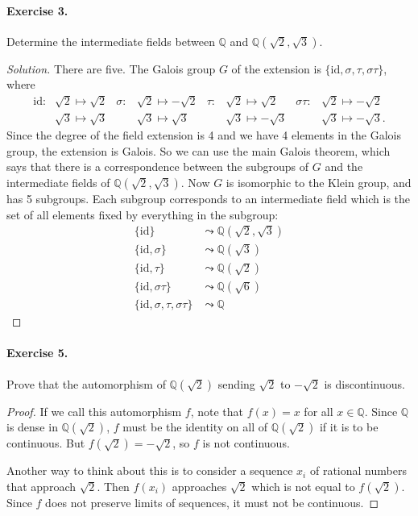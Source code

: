 \documentclass{article}
\begin{document}
\paragraph{Exercise 3.} Determine the intermediate fields between $\mathbb Q$ and $\mathbb Q(\sqrt 2,\sqrt 3)$.
\begin{proof}[Solution]
There are five. The Galois group $G$ of the extension is $\{\text{id},\sigma,\tau,\sigma\tau\}$, where
\begin{align*}
\text{id}:&\sqrt 2\mapsto \sqrt 2 &
\sigma:& \sqrt 2\mapsto -\sqrt 2 &
\tau:& \sqrt 2\mapsto \sqrt 2 &
\sigma\tau:& \sqrt 2\mapsto -\sqrt 2 \\
&\sqrt 3\mapsto \sqrt 3 &
& \sqrt 3\mapsto \sqrt 3 &
& \sqrt 3\mapsto -\sqrt 3 &
& \sqrt 3\mapsto -\sqrt 3 .
\end{align*}
Since the degree of the field extension is 4 and we have 4 elements in the Galois group, the extension is Galois. So we can use the main Galois theorem, which says that there is a correspondence between the subgroups of $G$ and the intermediate fields of $\mathbb Q(\sqrt 2,\sqrt 3).$ Now $G$ is isomorphic to the Klein group, and has 5 subgroups. Each subgroup corresponds to an intermediate field which is the set of all elements fixed by everything in the subgroup:
\begin{align*}
\{\text{id}\}  &\leadsto  \mathbb Q(\sqrt 2,\sqrt 3)\\
\{\text{id},\sigma\}  &\leadsto  \mathbb Q(\sqrt 3)\\
\{\text{id},\tau\}  &\leadsto  \mathbb Q(\sqrt 2)\\
\{\text{id},\sigma\tau\}  &\leadsto  \mathbb Q(\sqrt 6)\\
\{\text{id},\sigma,\tau,\sigma\tau\}  &\leadsto  \mathbb Q
\end{align*}

\end{proof}

\paragraph{Exercise 5.} Prove that the automorphism of $\mathbb Q(\sqrt 2)$ sending $\sqrt 2$ to $-\sqrt 2$ is discontinuous.
\begin{proof}
If we call this automorphism $f$, note that $f(x)=x$ for all $x\in \mathbb Q$. Since $\mathbb Q$ is dense in $\mathbb Q(\sqrt 2)$, $f$ must be the identity on all of $\mathbb Q(\sqrt 2)$ if it is to be continuous. But $f(\sqrt 2)=-\sqrt 2$, so $f$ is not continuous. 

Another way to think about this is to consider a sequence $x_i$ of rational numbers that approach $\sqrt 2$. Then $f(x_i)$ approaches $\sqrt 2$ which is not equal to $f(\sqrt 2)$. Since $f$ does not preserve limits of sequences, it must not be continuous. 
\end{proof}
\end{document}
